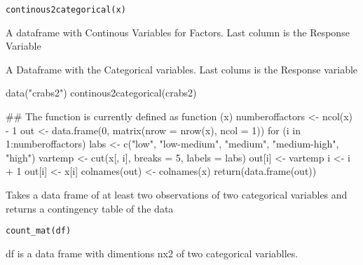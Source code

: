\documentclass[letterpaper]{book}
\begin{document}
%
\begin{Usage}
\begin{verbatim}
continous2categorical(x)
\end{verbatim}
\end{Usage}
%
\begin{Arguments}
\begin{ldescription}
\item[\code{x}] A dataframe with Continous Variables for Factors. Last column is the Response Variable
\end{ldescription}
\end{Arguments}
%
\begin{Value}
A Dataframe with the Categorical variables. Last colums is the Response variable





\end{Value}
%
\begin{Examples}
\begin{ExampleCode}

data("crabs2")
continous2categorical(crabs2)

## The function is currently defined as
function (x) 
{
    numberoffactors <- ncol(x) - 1
    out <- data.frame(0, matrix(nrow = nrow(x), ncol = 1))
    for (i in 1:numberoffactors) {
        labs <- c("low", "low-medium", "medium", "medium-high", 
            "high")
        vartemp <- cut(x[, i], breaks = 5, labels = labs)
        out[i] <- vartemp
    }
    i <- i + 1
    out[i] <- x[i]
    colnames(out) <- colnames(x)
    return(data.frame(out))
  }
\end{ExampleCode}
\end{Examples}
%
\begin{Description}\relax
Takes a data frame of at least two observations of two categorical variables 
and returns a contingency table of the data 
\end{Description}
%
\begin{Usage}
\begin{verbatim}
count_mat(df)
\end{verbatim}
\end{Usage}
%
\begin{Arguments}
\begin{ldescription}
\item[\code{df}] 
df is a data frame with dimentions nx2 of two categorical variablles. 

\end{ldescription}
\end{Arguments}
\end{document}
